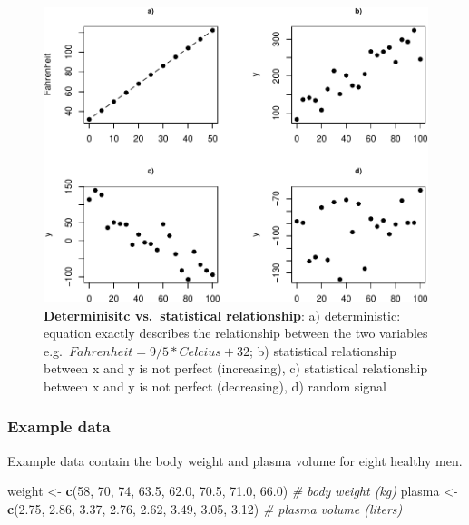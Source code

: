 \documentclass[]{article}
\newenvironment{Shaded}{\begin{snugshade}}{\end{snugshade}}
\newcommand{\CommentTok}[1]{\textcolor[rgb]{0.56,0.35,0.01}{\textit{#1}}}
\newcommand{\DecValTok}[1]{\textcolor[rgb]{0.00,0.00,0.81}{#1}}
\newcommand{\FloatTok}[1]{\textcolor[rgb]{0.00,0.00,0.81}{#1}}
\newcommand{\KeywordTok}[1]{\textcolor[rgb]{0.13,0.29,0.53}{\textbf{#1}}}
\newcommand{\NormalTok}[1]{#1}
\newcommand{\StringTok}[1]{\textcolor[rgb]{0.31,0.60,0.02}{#1}}
\begin{document}
\begin{figure}
\centering
\includegraphics{session-regression-I-files/figures/det-vs-stat-1.pdf}
\caption{\textbf{Determinisitc vs.~statistical relationship}: a)
deterministic: equation exactly describes the relationship between the
two variables e.g.~\(Fahrenheit=9/5*Celcius+32\); b) statistical
relationship between x and y is not perfect (increasing), c) statistical
relationship between x and y is not perfect (decreasing), d) random
signal}
\end{figure}

\hypertarget{example-data}{%
\subsubsection{Example data}\label{example-data}}

Example data contain the body weight and plasma volume for eight healthy
men.

\begin{Shaded}
\begin{Highlighting}[]
\NormalTok{weight <-}\StringTok{ }\KeywordTok{c}\NormalTok{(}\DecValTok{58}\NormalTok{, }\DecValTok{70}\NormalTok{, }\DecValTok{74}\NormalTok{, }\FloatTok{63.5}\NormalTok{, }\FloatTok{62.0}\NormalTok{, }\FloatTok{70.5}\NormalTok{, }\FloatTok{71.0}\NormalTok{, }\FloatTok{66.0}\NormalTok{) }\CommentTok{# body weight (kg)}
\NormalTok{plasma <-}\StringTok{ }\KeywordTok{c}\NormalTok{(}\FloatTok{2.75}\NormalTok{, }\FloatTok{2.86}\NormalTok{, }\FloatTok{3.37}\NormalTok{, }\FloatTok{2.76}\NormalTok{, }\FloatTok{2.62}\NormalTok{, }\FloatTok{3.49}\NormalTok{, }\FloatTok{3.05}\NormalTok{, }\FloatTok{3.12}\NormalTok{) }\CommentTok{# plasma volume (liters)}
\end{Highlighting}
\end{Shaded}
\end{document}
